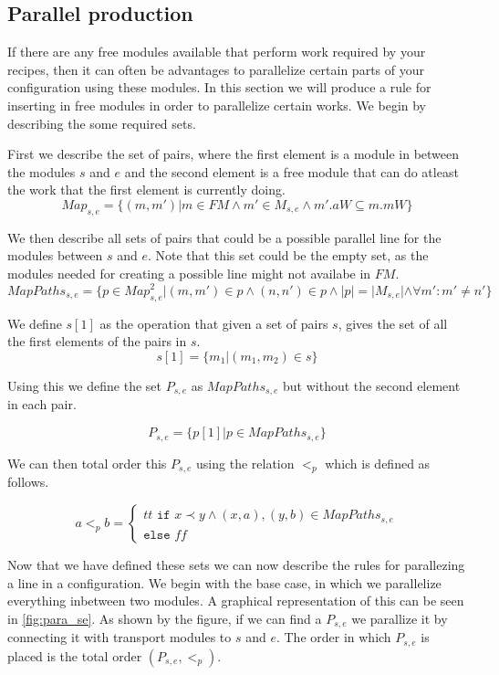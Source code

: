 \subsection{Parallel production}
If there are any free modules available that perform work required by your recipes, then it can often be advantages to parallelize certain parts of your configuration using these modules. In this section we will produce a rule for inserting in free modules in order to parallelize certain works. We begin by describing the some required sets.

First we describe the set of pairs, where the first element is a module in between the modules $s$ and $e$ and the second element is a free module that can do atleast the work that the first element is currently doing.
\[Map_{s, e} = \{(m, m')| m \in FM \land m' \in M_{s,e} \land m'.aW \subseteq m.mW\} \]


We then describe all sets of pairs that could be a possible parallel line for the modules between $s$ and $e$. Note that this set could be the empty set, as the modules needed for creating a possible line might not availabe in $FM$.
\[MapPaths_{s,e} = \{p \in {Map}_{s,e}^2 | (m,m') \in p \land (n,n') \in p \land |p| = |M_{s,e}| \land  \forall m': m' \neq n' \}\]

We define $s[1]$ as the operation that given a set of pairs $s$, gives the set of all the first elements of the pairs in $s$.
\[s[1] = \{m_1 | (m_1, m_2) \in s\}\]

Using this we define the set $P_{s,e}$ as $MapPaths_{s,e}$ but without the second element in each pair.

\[ P_{s,e} = \{p[1] | p \in MapPaths_{s,e}\}\]

We can then total order this $P_{s,e}$ using the relation $<_p$ which is defined as follows.

\[a <_{p} b = 
\left\{\begin{matrix}
tt \texttt{ if } x \prec y \land (x, a), (y, b) \in MapPaths_{s,e}\\
\texttt{else } ff
\end{matrix}\right.\]

Now that we have defined these sets we can now describe the rules for parallezing a line in a configuration. We begin with the base case, in which we parallelize everything inbetween two modules. A graphical representation of this can be seen in \cref{fig:para_se}. As shown by the figure, if we can find a $P_{s,e}$ we parallize it by connecting it with transport modules to $s$ and $e$. The order in which $P_{s,e}$ is placed is the total order $(P_{s,e},<_p)$. 

